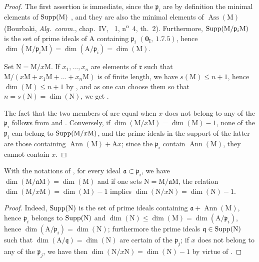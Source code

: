 \begin{proof}
The first assertion is immediate, since the $\mathfrak{p}_i$ are by definition the minimal elements of $\operatorname{Supp}(\mathrm{M})$ , and they are also the minimal elements of $\operatorname{Ass}(\mathrm{M})$ (Bourbaki, \emph{Alg.~comm.}, chap.~IV, \textsection~1, n\textsuperscript{o}~4, th.~2).
Furthermore, $\operatorname{Supp}(\mathrm{M}/\mathfrak{p}_i\mathrm{M})$ is the set of prime ideals of $\mathrm{A}$ containing $\mathfrak{p}_i$ $(\mathbf{0}_\mathrm{I},~1.7.5)$, hence $\dim(\mathrm{M}/\mathfrak{p}_i\mathrm{M})=\dim(\mathrm{A}/\mathfrak{p}_i)=\dim(\mathrm{M})$.

Set $\mathrm{N}=\mathrm{M}/x\mathrm{M}$.
If $x_1,\ldots,x_n$ are elements of $\mathfrak{r}$ such that $\mathrm{M}/(x\mathrm{M}+x_1\mathrm{M}+\ldots+x_n\mathrm{M})$ is of finite length, we have $s(\mathrm{M})\leq n+1$, hence $\dim(\mathrm{M})\leq n+1$ by , and as one can choose them so that $n=s(\mathrm{N})=\dim(\mathrm{N})$, we get .

The fact that the two members of  are equal when $x$ does not belong to any of the $\mathfrak{p}_i$ follows from  and .
Conversely, if  $\dim(\mathrm{M}/x\mathrm{M})=\dim(\mathrm{M})-1$, none of the $\mathfrak{p}_i$ can belong to $\operatorname{Supp}(\mathrm{M}/x\mathrm{M})$, and the prime ideals in the support of the latter are those containing $\operatorname{Ann}(\mathrm{M})+\mathrm{A}x$; since the $\mathfrak{p}_i$ contain $\operatorname{Ann}(\mathrm{M})$, they cannot contain $x$.
\end{proof}

\begin{corollary}[16.3.5]
\label{0.16.3.5}
With the notations of , for every ideal $\mathfrak{a}\subset\mathfrak{p}_i$, we have $\dim(\mathrm{M}/\mathfrak{a}\mathrm{M})=\dim(\mathrm{M})$ and if one sets $\mathrm{N}=\mathrm{M}/\mathfrak{a}\mathrm{M}$, the relation $\dim(\mathrm{M}/x\mathrm{M})=\dim(\mathrm{M})-1$ implies $\dim(\mathrm{N}/x\mathrm{N})=\dim(\mathrm{N})-1$.
\end{corollary}

\begin{proof}
Indeed, $\operatorname{Supp}(\mathrm{N})$ is the set of prime ideals containing $\mathfrak{a}+\operatorname{Ann}(\mathrm{M})$, hence $\mathfrak{p}_i$ belongs to $\operatorname{Supp}(\mathrm{N})$ and $\dim(\mathrm{N})\leq\dim(\mathrm{M})=\dim(\mathrm{A}/\mathfrak{p}_i)$, hence $\dim(\mathrm{A}/\mathfrak{p}_i)=\dim(\mathrm{N})$; furthermore the prime ideals $\mathfrak{q}\in\operatorname{Supp}(\mathrm{N})$ such that $\dim(\mathrm{A}/\mathfrak{q})=\dim(\mathrm{N})$ are certain of the $\mathfrak{p}_j$; if $x$ does not belong to any of the $\mathfrak{p}_j$, we have then $\dim(\mathrm{N}/x\mathrm{N})=\dim(\mathrm{N})-1$ by virtue of .
\end{proof}

